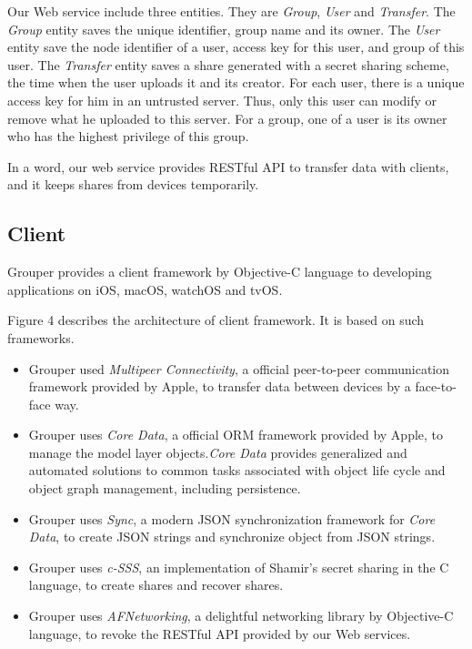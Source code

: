 \documentclass[twocolumn,10pt]{article}
\begin{document}
Our Web service include three entities. They are \emph{Group}, \emph{User} and \emph{Transfer}. The \emph{Group} entity saves the unique identifier, group name and its owner. The \emph{User} entity save the node identifier of a user, access key for this user, and group of this user. The \emph{Transfer} entity saves a share generated with a secret sharing scheme, the time when the user uploads it and its creator. For each user, there is a unique access key for him in an untrusted server. Thus, only this user can modify or remove what he uploaded to this server. For a group, one of a user is its owner who has the highest privilege of this group.

In a word, our web service provides RESTful API to transfer data with clients, and it keeps shares from devices temporarily.

\subsection{Client}

Grouper provides a client framework by Objective-C language to developing applications on iOS, macOS, watchOS and tvOS. 
 
Figure 4 describes the architecture of client framework. It is based on such frameworks.   

\begin{itemize}
	\setlength{\itemsep}{1pt}
	\setlength{\parskip}{0pt}
	\setlength{\parsep}{0pt}
	\item Grouper used \emph{Multipeer Connectivity}\cite{mc},  a official peer-to-peer communication framework provided by Apple, to transfer data between devices by a face-to-face way.
	\item Grouper uses \emph{Core Data}\cite{coredata}, a official ORM framework provided by Apple, to manage the model layer objects.\emph{Core Data} provides generalized and automated solutions to common tasks associated with object life cycle and object graph management, including persistence.
	\item Grouper uses \emph{Sync}\cite{sync}, a modern JSON synchronization framework for \emph{Core Data}, to create JSON strings and synchronize object from JSON strings.
	\item Grouper uses \emph{c-SSS}\cite{c-sss}, an implementation of Shamir's secret sharing in the C language, to create shares and recover shares.
	\item Grouper uses \emph{AFNetworking}\cite{afnetworking}, a delightful networking library by Objective-C language, to revoke the RESTful API provided by our Web services. 
\end{itemize}
\end{document}
